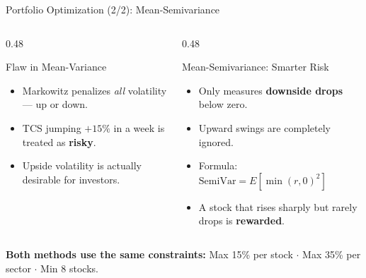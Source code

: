 \documentclass[aspectratio=169, 10pt]{beamer}
\begin{document}
\begin{frame}{Portfolio Optimization (2/2): Mean-Semivariance}
    \begin{columns}[T]
        \begin{column}{0.48\textwidth}
            \begin{block}{Flaw in Mean-Variance}
                \begin{itemize}
                    \item Markowitz penalizes \textit{all} volatility — up or down.
                    \item TCS jumping $+15\%$ in a week is treated as \textbf{risky}.
                    \item Upside volatility is actually desirable for investors.
                \end{itemize}
            \end{block}
        \end{column}
        \begin{column}{0.48\textwidth}
            \begin{block}{Mean-Semivariance: Smarter Risk}
                \begin{itemize}
                    \item Only measures \textbf{downside drops} below zero.
                    \item Upward swings are completely ignored.
                    \item Formula: $\text{SemiVar} = E[\min(r, 0)^2]$
                    \item A stock that rises sharply but rarely drops is \textbf{rewarded}.
                \end{itemize}
            \end{block}
        \end{column}
    \end{columns}
    \vspace{0.4em}
    \small \textbf{Both methods use the same constraints:} Max 15\% per stock $\cdot$ Max 35\% per sector $\cdot$ Min 8 stocks.
\end{frame}

\end{document}
